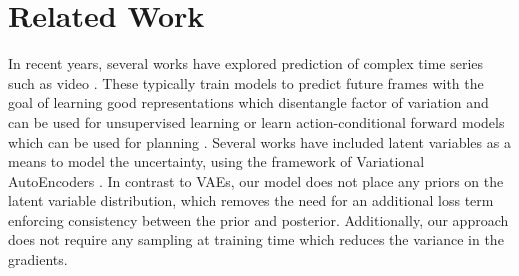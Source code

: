 \documentclass{article}
\begin{document}

\section{Related Work}

In recent years, several works have explored prediction of complex time series such as video \citep{mathieu-iclr-2016,canziani2017cortexnet}.
These typically train models to predict future frames with the goal of learning good representations which disentangle factor of variation and can be used for unsupervised learning \citep{Srivastava15, Villegas17, DentonB17} or learn action-conditional forward models which can be used for planning \citep{Oh15, FinnGL16, Poke, VideoPixel}.
Several works have included latent variables as a means to model the uncertainty, using the framework of Variational AutoEncoders \citep{Babaeizadeh2018, Denton2018}.
In contrast to VAEs, our model does not place any priors on the latent variable distribution, which removes the need for an additional loss term enforcing consistency between the prior and posterior.
Additionally, our approach does not require any sampling at training time which reduces the variance in the gradients.
\end{document}
